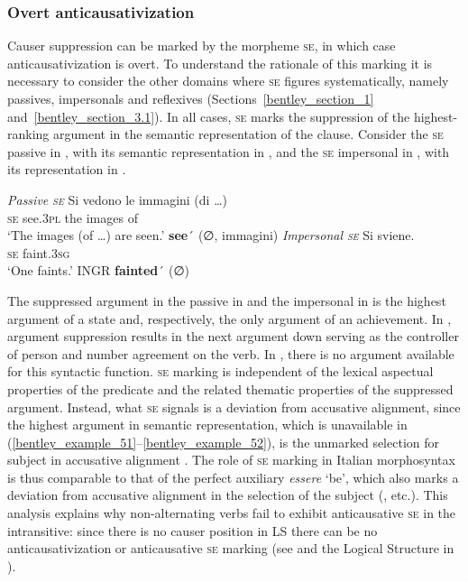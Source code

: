 \documentclass[output=paper,colorlinks,citecolor=brown
]{langscibook}
\begin{document}
\subsubsection{Overt anticausativization}
\label{bentley_section_5.4.1}
Causer suppression can be marked by the morpheme \textsc{se}, in which case anticausativization is overt. To understand the rationale of this marking it is necessary to consider the other domains where \textsc{se} figures systematically, namely passives, impersonals and reflexives (Sections~\ref{bentley_section_1} and~\ref{bentley_section_3.1}). In all cases, \textsc{se} marks the suppression of the highest-ranking argument in the semantic representation of the clause. Consider the \textsc{se} passive in , with its semantic representation in , and the \textsc{se} impersonal in , with its representation in .

\ea \label{bentley_example_51}
    \textit{Passive \textsc{se}}
    \ea \label{bentley_example_51a}
    \gll Si		vedono	le		immagini (di \ldots)\\
    \textsc{se}		see.3\textsc{pl}		the	images		of\\
    \glt 	‘The images (of \ldots) are seen.’
    \ex \label{bentley_example_51b}
    \textbf{see}´ (∅, immagini)
    \z
\ex \label{bentley_example_52}
    \textit{Impersonal \textsc{se}}
    \ea \label{bentley_example_52a}
    \gll Si 	sviene.\\
    \textsc{se}		faint.3\textsc{sg}	 \\
    \glt 	‘One faints.’
    \ex \label{bentley_example_52b}
    INGR \textbf{fainted}´ (∅)
    \z
\z

The suppressed argument in the passive in  and the impersonal in  is the highest argument of a state and, respectively, the only argument of an achievement. In , argument suppression results in the next argument down serving as the controller of person and number agreement on the verb. In , there is no argument available for this syntactic function. \textsc{se} marking is independent of the lexical aspectual properties of the predicate and the related thematic properties of the suppressed argument. Instead, what \textsc{se} signals is a deviation from accusative alignment, since the highest argument in semantic representation, which is unavailable in (\ref{bentley_example_51}--\ref{bentley_example_52}), is the unmarked selection for subject in accusative alignment \citep[175]{vanvalin1997syntax}. The role of \textsc{se} marking in Italian morphosyntax is thus comparable to that of the perfect auxiliary \textit{essere} ‘be’, which also marks a deviation from accusative alignment in the selection of the subject (\cite{lafauci1988oggetti,bentley2006split,ledgeway2012latin,loporcaro2016auxiliary}, etc.). This analysis explains why non-alternating verbs fail to exhibit anticausative \textsc{se} in the intransitive: since there is no causer position in LS there can be no anticausativization or anticausative \textsc{se} marking (see  and the Logical Structure in ).
\end{document}
